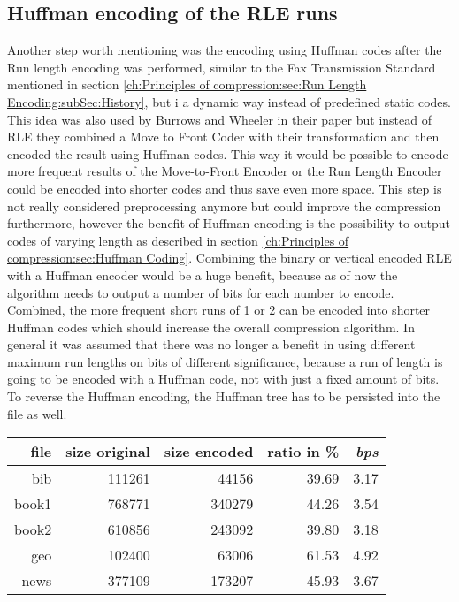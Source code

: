 {{\subsection{Huffman encoding of the RLE runs}
\label{ch:Conceptual Design:sec:Postprocessing}
\par{
Another step worth mentioning was the encoding using Huffman codes after the Run length encoding was performed, similar to the Fax Transmission Standard mentioned in section \ref{ch:Principles of compression:sec:Run Length Encoding:subSec:History}, but i a dynamic way instead of predefined static codes. This idea was also used by Burrows and Wheeler in their paper \cite{Burrows94} but instead of RLE they combined a Move to Front Coder with their transformation and then encoded the result using Huffman codes. This way it would be possible to encode more frequent results of the Move-to-Front Encoder or the Run Length Encoder could be encoded into shorter codes and thus save even more space. This step is not really considered preprocessing anymore but could improve the compression furthermore, however the benefit of Huffman encoding is the possibility to output codes of varying length as described in section \ref{ch:Principles of compression:sec:Huffman Coding}. Combining the binary or vertical encoded RLE with a Huffman encoder would be a huge benefit, because as of now the algorithm needs to output a number of bits for each number to encode. Combined, the more frequent short runs of 1 or 2 can be encoded into shorter Huffman codes which should increase the overall compression algorithm. In general it was assumed that there was no longer a benefit in using different maximum run lengths on bits of different significance, because a run of length is going to be encoded with a Huffman code, not with just a fixed amount of bits. To reverse the Huffman encoding, the Huffman tree has to be persisted into the file as well.
	\begin{table}[h]
		\centering
		\begin{tabular}{r|r|r|r|r}	
			file & size original & size encoded & ratio in \% & \textit{bps}\\
			\hline
bib & 111261 & 44156 & 39.69 & 3.17 \\
book1 & 768771 & 340279 & 44.26 & 3.54 \\
book2 & 610856 & 243092 & 39.80 & 3.18 \\
geo & 102400 & 63006 & 61.53 & 4.92 \\
news & 377109 & 173207 & 45.93 & 3.67 \\

\end{tabular}
\end{table}}}}
